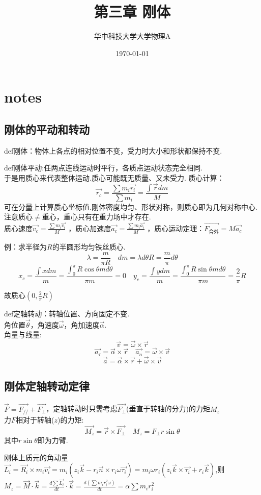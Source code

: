 \documentclass[10pt,a4paper]{article}
\title{第三章 刚体}
\author{华中科技大学大学物理A}
\date{\today}
\begin{document}
\maketitle
\section{notes}
\subsection{刚体的平动和转动}
def刚体：物体上各点的相对位置不变，受力时大小和形状都保持不变.

def刚体平动:任两点连线运动时平行，各质点运动状态完全相同.
\\于是用质心来代表整体运动.质心可能既无质量、又未受力.
质心计算：
\[
\vec{r_c}=\frac{\sum m_i\vec{r_i}}{\sum m_i}
=\frac{\int\vec{r}dm}{M}
\]
可在分量上计算质心坐标值.刚体密度均匀、形状对称，则质心即为几何对称中心.
注意质心$\neq$重心，重心只有在重力场中才存在.
\\质心速度$\vec{v_c}=\frac{\sum m_i\vec{v_i}}{M}$
，质心加速度$\vec{a_c}=\frac{\sum m_i\vec{a_i}}{M}$
，质心运动定理：$\vec{F_\text{合外}}=M\vec{a_c}$

{\fontsize{8pt}{8pt}\selectfont
例：求半径为$R$的半圆形均匀铁丝质心.
\[\lambda=\frac{m}{\pi R}\quad dm=\lambda d\theta R=\frac{m}{\pi}d\theta
\]
\[x_c=\frac{\int xdm}{m}=\frac{\int_0^\pi R\cos\theta md\theta}{\pi m}=0
\quad y_c=\frac{\int ydm}{m}=\frac{\int_0^\pi R\sin\theta md\theta}{\pi m}=\frac{2}{\pi}R\]

故质心$(0,\frac{2}{\pi}R)$
}

def定轴转动：转轴位置、方向固定不变.\\
角位置$\vec{\theta}$，角速度$\vec{\omega}$，角加速度$\vec{\alpha}$.\\
角量与线量:
\[\vec{v}=\vec{\omega}\times\vec{r}\]
\[\boxed{\vec{a_{\tau}}=\vec{\alpha}\times\vec{r}}\quad\vec{a_n}=\vec{\omega}\times\vec{v}\]
\[\vec{a}=\vec{\alpha}\times\vec{r}+\vec{\omega}\times\vec{v}\]
\subsection{刚体定轴转动定律}
$\vec{F}=\vec{F_{//}}+\vec{F_\perp}$，定轴转动时只需考虑$\vec{F_{\perp}}$(垂直于转轴的分力)的力矩$M_z$
\\力$F$相对于转轴($z$)的力矩:
\[\vec{M_z}=\vec{r}\times\vec{F_\perp}\quad M_z=F_\perp r\sin\theta\]
其中$r\sin\theta$即为力臂.

{
\fontsize{8pt}{8pt}\selectfont
刚体上质元的角动量$\vec{L_i}=\vec{R_i}\times m_i\vec{v_i}=m_i(z_i\vec{k}-r_i\vec{n}\times r_i\omega\vec{\tau_i})
=m_i\omega r_i(z_i\vec{k}\times \vec{\tau_i}+r_i\vec{k})$,则
$M_z=\vec{M}\cdot\vec{k}=\frac{d\sum \vec{L_i}}{dt}\cdot\vec{k}=\frac{d(\sum m_ir_i^2\omega)}{dt}=\alpha\sum m_ir_i^2$
}
\end{document}
